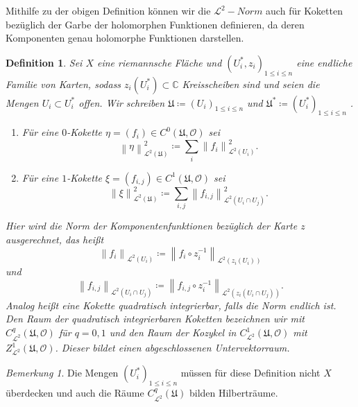 \documentclass[11pt,a4paper]{scrartcl}
\theoremstyle{thm}
\theoremstyle{def}
\newtheorem{defi}{Definition}[section]
\theoremstyle{remark}
\newtheorem*{bem}{Bemerkung}
\newcommand{\norm}[1]{\left\lVert#1\right\rVert}
\begin{document}
Mithilfe zu der obigen Definition können wir die $\mathcal{L}^2-Norm$ auch für Koketten bezüglich der Garbe der holomorphen Funktionen definieren, da deren Komponenten genau holomorphe Funktionen darstellen.
\begin{defi}
Sei $X$ eine riemannsche Fläche und $\left( U_i^{*},z_i\right)_{1\leq i\leq n}$ eine endliche Familie von Karten, sodass $z_i(U_i^{*})\subset \mathbb{C}$ Kreisscheiben sind und seien die Mengen $U_i\subset U_i^{*}$ offen. Wir schreiben $\mathfrak{U}\coloneqq\left( U_i \right)_{1\leq i\leq n}$ und $\mathfrak{U}^{*}\coloneqq\left( U_i^{*}\right)_{1\leq i\leq n}$ .
\begin{enumerate}
\item
Für eine $0$-Kokette $\eta = (f_i)\in C^0(\mathfrak{U},\mathcal{O})$ sei
$$
\norm{\eta}_{\mathcal{L}^2(\mathfrak{U})}^2 \coloneqq \sum_i \norm{f_i}_{\mathcal{L}^2(U_i)}^2.
$$
\item
Für eine $1$-Kokette $\xi= (f_{i,j})\in C^1(\mathfrak{U,\mathcal{O}}) $ sei 
$$
\norm{\xi}_{\mathcal{L}^2 (\mathfrak{U})}^2\coloneqq \sum_{i,j} \norm{f_{i,j}}_{\mathcal{L}^2(U_i\cap U_j)}^2.
$$
\end{enumerate} 
Hier wird die Norm der Komponentenfunktionen bezüglich der Karte $z$ ausgerechnet, das heißt
$$
\norm{f_i}_{\mathcal{L}^2(U_i)} \coloneqq \norm{f_i\circ z_i^{-1}}_{\mathcal{L}^2(z_i(U_i))}
$$ 
und 
$$
\norm{f_{i,j}}_{\mathcal{L}^2(U_i\cap U_j)}\coloneqq \norm{f_{i,j}\circ z_i^{-1}}_{\mathcal{L}^2(z_i(U_i\cap U_j))}.
$$
Analog heißt eine Kokette \emph{quadratisch integrierbar}, falls die Norm endlich ist. \\Den Raum der quadratisch integrierbaren Koketten bezeichnen wir mit $C^q_{\mathcal{L}^2}(\mathfrak{U},\mathcal{O})$ für $q=0,1$ und den Raum der Kozykel in $C^1_{\mathcal{L}^2}(\mathfrak{U},\mathcal{O})$ mit $Z^1_{\mathcal{L}^2}(\mathfrak{U},\mathcal{O})$. Dieser bildet einen abgeschlossenen Untervektorraum.
\end{defi}
\begin{bem}
Die Mengen $(U^*_i)_{1\leq i\leq n }$ müssen für diese Definition nicht $X$ überdecken und auch die Räume $C^q_{\mathcal{L}^2}(\mathfrak{U})$ bilden Hilberträume.
\end{bem}
\end{document}
